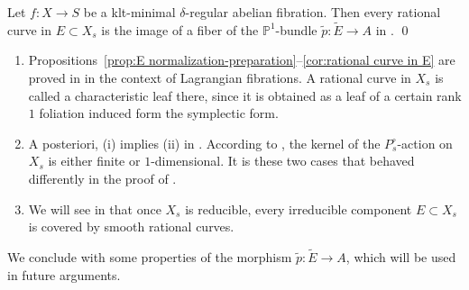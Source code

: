 \documentclass[reqno, letterpaper]{amsart}
\numberwithin{equation}{subsection}
\let\to\longrightarrow
\newcommand{\PP}{\mathbb{P}}
\begin{document}
		\begin{corollary} \label{cor:rational curve in E}
			Let $f : X \to S$ be a klt-minimal $\delta$-regular abelian fibration. Then every rational curve in $E \subset X_s$ is the image of a fiber of the $\PP^1$-bundle $\tilde p : \tilde E \to A$ in . \qed
		\end{corollary}
		
		\begin{remark}
			\begin{enumerate}
				\item Propositions~\ref{prop:E normalization-preparation}--\ref{cor:rational curve in E} are proved in \cite[\S 2--3]{hwang-ogu09} in the context of Lagrangian fibrations. A rational curve in $X_s$ is called a characteristic leaf there, since it is obtained as a leaf of a certain rank $1$ foliation induced form the symplectic form.
				
				\item A posteriori, (i) implies (ii) in . According to , the kernel of the $P^\circ_s$-action on $X_s$ is either finite or $1$-dimensional. It is these two cases that behaved differently in the proof of .
				
				\item We will see in  that once $X_s$ is reducible, every irreducible component $E \subset X_s$ is covered by smooth rational curves.
			\end{enumerate}
		\end{remark}
		
		We conclude with some properties of the morphism $\tilde p : \tilde E \to A$, which will be used in future arguments.
		
\end{document}
